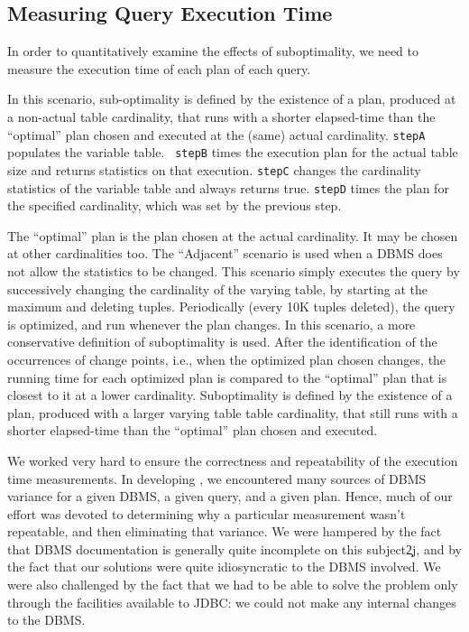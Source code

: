 \subsection{Measuring Query Execution Time}\label{sec:subopt}
In order to quantitatively examine the effects of suboptimality, we need to
measure the execution time of each plan of each query.

In this scenario, sub-optimality is defined by the existence
of a plan, produced at a non-actual table cardinality, that runs with a
shorter elapsed-time than the ``optimal'' plan chosen and executed at the
(same) actual cardinality. {\tt stepA} populates the variable table. {\tt
  stepB} times the execution plan for the actual table size and returns
statistics on that execution. {\tt stepC} changes the cardinality statistics
of the variable table and always returns true. {\tt stepD} times the plan
for the specified cardinality, which was set by the previous step.

The ``optimal'' plan is the plan chosen at the actual cardinality. It may 
be chosen at other cardinalities too. 
The ``Adjacent'' scenario is used when a DBMS does not allow the statistics to
be changed. This scenario simply executes the query by successively changing
the cardinality of the varying table, by starting at the maximum and
deleting tuples. Periodically (every 10K tuples deleted), the query is
optimized, and run whenever the plan changes. In this scenario, a more
conservative definition of suboptimality is used. After the identification of the occurrences of change points, i.e., when the optimized plan chosen changes, 
the running time for each optimized plan is compared to the ``optimal'' plan that is 
closest to it at a lower cardinality. Suboptimality is defined
by the existence of a plan, produced with a larger varying table table
cardinality, that still runs with a shorter elapsed-time than the
``optimal'' plan chosen and executed.


We worked very hard to ensure the correctness and repeatability of the
execution time measurements. In developing \azdb, we encountered many sources
of DBMS variance for a given DBMS, a given query, and a given plan. Hence,
much of our effort was devoted to determining why a particular measurement
wasn't repeatable, and then eliminating that variance. We were hampered by
the fact that DBMS documentation is generally quite incomplete on this
subject\c2j{}{, and by the fact that our solutions were quite idiosyncratic to the
DBMS involved}. We were also challenged by the fact that we had to be able to
solve the problem only through the facilities available to JDBC: we could
not make any internal changes to the DBMS.

